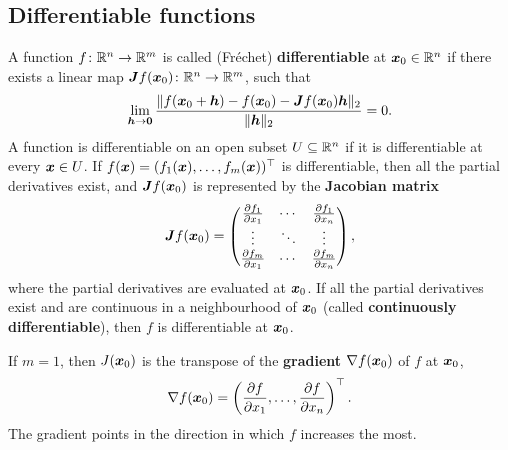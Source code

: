 \subsection{Differentiable functions}
A function $f\colon \mathbb{R}^n\to \mathbb{R}^m$ is called (Fr\'echet) \textbf{differentiable} at $\bm{x}_0\in \mathbb{R}^n$ if there exists a linear map $\bm{J}f(\bm{x}_0)\colon \mathbb{R}^n \to \mathbb{R}^m$, such that
\begin{equation*}
 \lim_{\bm{h}\to \bm{0}}\frac{\Vert {f(\bm{x}_0+\bm{h})-f(\bm{x}_0)-\bm{J}f(\bm{x}_0)\bm{h}}\Vert_2}{\Vert {\bm{h}}\Vert_2}=0.
\end{equation*}
A function is differentiable on an open subset $U\subseteq \mathbb{R}^n$ if it is differentiable at every $\bm{x}\in U$.
If $f(\bm{x})=(f_1(\bm{x}),\dots,f_m(\bm{x}))^{\top}$ is differentiable, then all the partial derivatives exist, and $\bm{J}f(\bm{x}_0)$ is represented by the \textbf{Jacobian matrix}
\begin{equation*}
 \bm{J}f(\bm{x}_0) = \begin{pmatrix}
            \frac{\partial f_1}{\partial x_1} & \cdots & \frac{\partial f_1}{\partial x_n}\\
            \vdots & \ddots & \vdots\\
            \frac{\partial f_m}{\partial x_1} & \cdots & \frac{\partial f_m}{\partial x_n}
           \end{pmatrix},
\end{equation*}
where the partial derivatives are evaluated at $\bm{x}_0$. If all the partial derivatives exist and are continuous in a neighbourhood of $\bm{x}_0$ (called \textbf{continuously differentiable}), then $f$ is differentiable at $\bm{x}_0$.

If $m=1$, then $J(\bm{x}_0)$ is the transpose of the \textbf{gradient} $\nabla f(\bm{x}_0)$ of $f$ at $\bm{x}_0$,
\begin{equation*}
 \nabla f(\bm{x}_0) = \left(\frac{\partial f}{\partial x_1},\dots,\frac{\partial f}{\partial x_n}\right)^{\top}.
\end{equation*}
The gradient points in the direction in which $f$ increases the most. 

